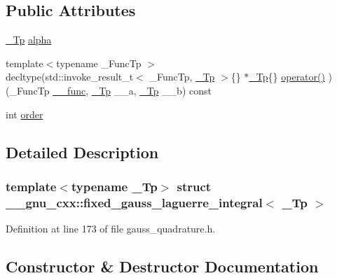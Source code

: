 \subsection*{Public Attributes}
\begin{DoxyCompactItemize}
\item 
\hyperlink{namespace____gnu__cxx_a3b19a9c800ca194374ef9172290f7d79}{\+\_\+\+Tp} \hyperlink{struct____gnu__cxx_1_1fixed__gauss__laguerre__integral_a48985900ea8b5bd1104d8b977c9d9d9e}{alpha}
\item 
{\footnotesize template$<$typename \+\_\+\+Func\+Tp $>$ }\\decltype(std\+::invoke\+\_\+result\+\_\+t$<$ \+\_\+\+Func\+Tp, \hyperlink{namespace____gnu__cxx_a3b19a9c800ca194374ef9172290f7d79}{\+\_\+\+Tp} $>$\{\} $\ast$\hyperlink{namespace____gnu__cxx_a3b19a9c800ca194374ef9172290f7d79}{\+\_\+\+Tp}\{\} \hyperlink{struct____gnu__cxx_1_1fixed__gauss__laguerre__integral_aa0fcf97f3a5d830227b787378d0db399}{operator()} )(\+\_\+\+Func\+Tp \hyperlink{namespace____gnu__cxx_af2b2f0c7a2ae72b922b1afefae5a65b2}{\+\_\+\+\_\+func}, \hyperlink{namespace____gnu__cxx_a3b19a9c800ca194374ef9172290f7d79}{\+\_\+\+Tp} \+\_\+\+\_\+a, \hyperlink{namespace____gnu__cxx_a3b19a9c800ca194374ef9172290f7d79}{\+\_\+\+Tp} \+\_\+\+\_\+b) const
\item 
int \hyperlink{struct____gnu__cxx_1_1fixed__gauss__laguerre__integral_a30797226c31b897d15facc65d55c673b}{order}
\end{DoxyCompactItemize}


\subsection{Detailed Description}
\subsubsection*{template$<$typename \+\_\+\+Tp$>$\newline
struct \+\_\+\+\_\+gnu\+\_\+cxx\+::fixed\+\_\+gauss\+\_\+laguerre\+\_\+integral$<$ \+\_\+\+Tp $>$}



Definition at line 173 of file gauss\+\_\+quadrature.\+h.



\subsection{Constructor \& Destructor Documentation}
\mbox{\label{struct____gnu__cxx_1_1fixed__gauss__laguerre__integral_ac17e6a5bc1b597c0cda245a47ed1053a}} 

